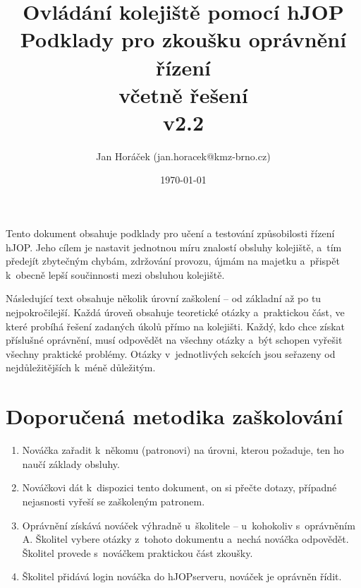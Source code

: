 \documentclass[12pt,a4paper]{article}
\begin{document}
\thispagestyle{empty}

\setlength{\parindent}{0cm}
\setlength{\parskip}{.4\baselineskip plus2pt minus1pt}
\setlength{\droptitle}{-5em}

\title{\bfseries
{\Large Ovládání kolejiště pomocí hJOP\\}
{\LARGE Podklady pro zkoušku oprávnění řízení\\}
\ifsolution
{\Large \color{gray}včetně řešení\\}
\fi
{\small v2.2}}
\author{Jan Horáček (jan.horacek@kmz-brno.cz)}
\date{\today}
\maketitle

Tento dokument obsahuje podklady pro učení a testování způsobilosti řízení
hJOP. Jeho cílem je nastavit jednotnou míru znalostí obsluhy kolejiště, a~tím
předejít zbytečným chybám, zdržování provozu, újmám na majetku a~přispět
k~obecně lepší součinnosti mezi obsluhou kolejiště.

Následující text obsahuje několik úrovní zaškolení – od základní až po tu
nejpokročilejší. Každá úroveň obsahuje teoretické otázky a~praktickou část, ve
které probíhá řešení zadaných úkolů přímo na kolejišti. Každý, kdo chce získat
příslušné oprávnění, musí odpovědět na všechny otázky a~být schopen vyřešit
všechny praktické problémy. Otázky v~jednotlivých sekcích jsou seřazeny od
nejdůležitějších k~méně důležitým.

\section{Doporučená metodika zaškolování}

\begin{enumerate}[leftmargin=*]
\item Nováčka zařadit k~někomu (patronovi) na úrovni, kterou požaduje, ten ho
naučí základy obsluhy.
\item Nováčkovi dát k~dispozici tento dokument, on si přečte dotazy, případné
nejasnosti vyřeší se zaškoleným patronem.
\item Oprávnění získává nováček výhradně u~školitele – u~kohokoliv s~oprávněním
A.
Školitel vybere otázky z~tohoto dokumentu a~nechá nováčka odpovědět. Školitel
provede s~no\-váč\-kem praktickou část zkoušky.
\item Školitel přidává login nováčka do hJOPserveru, nováček je oprávněn řídit.
\end{enumerate}
\end{document}
